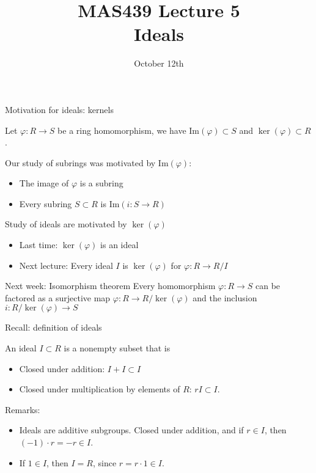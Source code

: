 \documentclass{beamer}
\title{MAS439 Lecture 5 \\ Ideals}
\date{October 12th}
\begin{document}
\begin{frame}
\titlepage
\end{frame}


\begin{frame}{Motivation for ideals: kernels}

Let $\varphi:R\to S$ be a ring homomorphism, we have $\textrm{Im}(\varphi)\subset S$ and $\ker(\varphi)\subset R$.

\begin{block}{Our study of subrings was motivated by $\textrm{Im}(\varphi)$:}
\begin{itemize}
\item The image of $\varphi$ is a subring
\item Every subring $S\subset R$ is $\textrm{Im}(i:S\to R)$
\end{itemize}
\end{block}

\begin{block}{Study of ideals are motivated by $\ker(\varphi)$}
\begin{itemize}
\item Last time: $\ker(\varphi)$ is an ideal
\item Next lecture: Every ideal $I$ is $\ker(\varphi)$ for $\varphi:R\to R/I$
\end{itemize}
\end{block}

\begin{block}{Next week: Isomorphism theorem}
Every homomorphism $\varphi:R\to S$ can be factored as a surjective map $\varphi:R\to R/\ker(\varphi)$ and the inclusion $i:R/\ker(\varphi)\to S$
\end{block}
\end{frame}


\begin{frame}{Recall: definition of ideals}
\begin{definition}
An ideal $I\subset R$ is a nonempty subset that is

\begin{itemize}
\item Closed under addition: $I+I\subset I$
\item Closed under multiplication by elements of $R$: $rI\subset I$.
\end{itemize}
\end{definition}

\begin{block}{Remarks:}
\begin{itemize}
\item Ideals are additive subgroups.  Closed under addition, and if $r\in I$, then $(-1)\cdot r=-r\in I$.
\item If $1\in I$, then $I=R$, since $r=r\cdot 1\in I$.
\end{itemize}

\end{block}

\end{frame}
\end{document}
